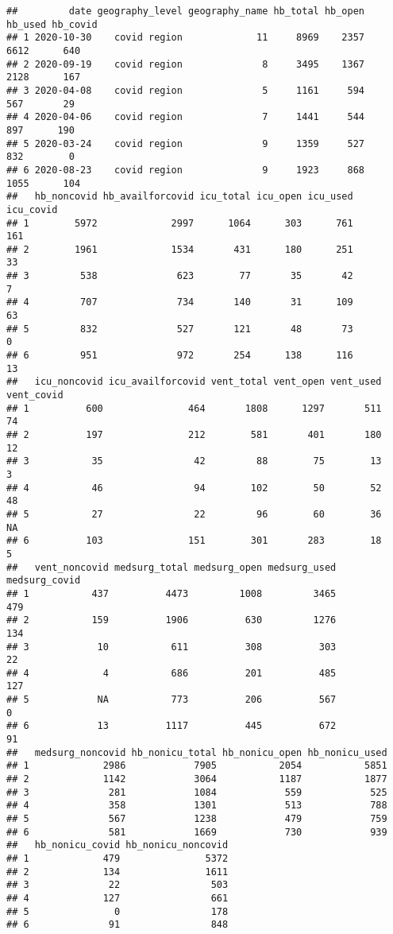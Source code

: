 \documentclass[
]{article}
\begin{document}
\begin{verbatim}
##         date geography_level geography_name hb_total hb_open hb_used hb_covid
## 1 2020-10-30    covid region             11     8969    2357    6612      640
## 2 2020-09-19    covid region              8     3495    1367    2128      167
## 3 2020-04-08    covid region              5     1161     594     567       29
## 4 2020-04-06    covid region              7     1441     544     897      190
## 5 2020-03-24    covid region              9     1359     527     832        0
## 6 2020-08-23    covid region              9     1923     868    1055      104
##   hb_noncovid hb_availforcovid icu_total icu_open icu_used icu_covid
## 1        5972             2997      1064      303      761       161
## 2        1961             1534       431      180      251        33
## 3         538              623        77       35       42         7
## 4         707              734       140       31      109        63
## 5         832              527       121       48       73         0
## 6         951              972       254      138      116        13
##   icu_noncovid icu_availforcovid vent_total vent_open vent_used vent_covid
## 1          600               464       1808      1297       511         74
## 2          197               212        581       401       180         12
## 3           35                42         88        75        13          3
## 4           46                94        102        50        52         48
## 5           27                22         96        60        36         NA
## 6          103               151        301       283        18          5
##   vent_noncovid medsurg_total medsurg_open medsurg_used medsurg_covid
## 1           437          4473         1008         3465           479
## 2           159          1906          630         1276           134
## 3            10           611          308          303            22
## 4             4           686          201          485           127
## 5            NA           773          206          567             0
## 6            13          1117          445          672            91
##   medsurg_noncovid hb_nonicu_total hb_nonicu_open hb_nonicu_used
## 1             2986            7905           2054           5851
## 2             1142            3064           1187           1877
## 3              281            1084            559            525
## 4              358            1301            513            788
## 5              567            1238            479            759
## 6              581            1669            730            939
##   hb_nonicu_covid hb_nonicu_noncovid
## 1             479               5372
## 2             134               1611
## 3              22                503
## 4             127                661
## 5               0                178
## 6              91                848
\end{verbatim}
\end{document}
